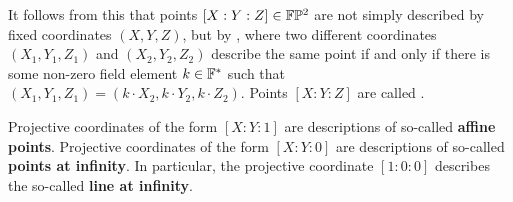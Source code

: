It follows from this that points $[X:Y:Z]\in \mathbb{F}\mathbb{P}^2$ are not simply described by fixed coordinates $(X,Y,Z)$, but by , where two different coordinates $(X_1,Y_1,Z_1)$ and $(X_2,Y_2,Z_2)$ describe the same point if and only if there is some non-zero field element $k\in\mathbb{F}^*$ such that $(X_1,Y_1,Z_1) = (k\cdot X_2,k\cdot Y_2,k\cdot Z_2)$. Points $[X:Y:Z]$ are called .

\begin{notation}
Projective coordinates of the form $[X:Y:1]$ are descriptions of so-called \textbf{affine points}.  Projective coordinates of the form $[X:Y:0]$ are descriptions of so-called \textbf{points at infinity}. In particular, the projective coordinate $[1:0:0]$ describes the so-called \textbf{line at infinity}.
\end{notation}
